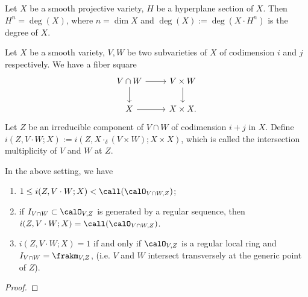   \begin{corollary}
    Let $X$ be a smooth projective variety, $H$ be a hyperplane section of $X$.
    Then $H^n = \deg(X)$, where $n = \dim X$ and $\deg(X) := \deg(X \cdot H^n)$ is the degree of $X$.
    
    \Yang{}
  \end{corollary}

  Let $X$ be a smooth variety, $V,W$ be two subvarieties of $X$ of codimension $i$ and $j$ respectively.
  We have a fiber square
  \[
    \begin{tikzcd}
      V \cap W \arrow[d] \arrow[r] & V\times W \arrow[d] \\
      X \arrow[r] & X \times X.
    \end{tikzcd}
  \]
  Let $Z$ be an irreducible component of $V \cap W$ of codimension $i+j$ in $X$.
  Define $i(Z, V \cdot W; X) := i(Z, X \cdot_\delta (V \times W); X \times X)$, which is called the intersection multiplicity of $V$ and $W$ at $Z$.

  \begin{proposition}
    In the above setting, we have
    \begin{enumerate}
      \item $1 \leq i(Z, V \cdot W; X) < \call(\calO_{V \cap W, Z})$;
      \item if $I_{V \cap W} \subset \calO_{V,Z}$ is generated by a regular sequence, then $i(Z, V \cdot W; X) = \call(\calO_{V \cap W, Z})$.
      \item $i(Z, V \cdot W; X) = 1$ if and only if $\calO_{V,Z}$ is a regular local ring and $I_{V \cap W} = \frakm_{V,Z}$, (i.e. $V$ and $W$ intersect transversely at the generic point of $Z$).
    \end{enumerate}

    \Yang{}
  \end{proposition}
  \begin{proof}
    \Yang{}
  \end{proof}